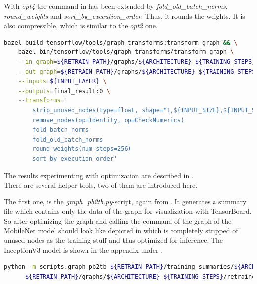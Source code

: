 With \textit{opt4} the command in  has been extended by \textit{fold_old_batch_norms}, \textit{round_weights} and \textit{sort_by_execution_order}. Thus, it rounds the weights. It is also compressible, which is similar to the \textit{opt2} one. \\

\begin{minipage}{\linewidth}
\begin{lstlisting}[caption=Build and call of \textit{transform_graph}, label=list:transform_graph_opt4, language=bash]
	bazel build tensorflow/tools/graph_transforms:transform_graph && \
	bazel-bin/tensorflow/tools/graph_transforms/transform_graph \
	--in_graph=${RETRAIN_PATH}/graphs/${ARCHITECTURE}_${TRAINING_STEPS}/retrained_dog_graph_${ARCHITECTURE}_${TRAINING_STEPS}_${LEARNING_RATE}.pb \
	--out_graph=${RETRAIN_PATH}/graphs/${ARCHITECTURE}_${TRAINING_STEPS}/opt4_retrained_dog_graph_${ARCHITECTURE}_${TRAINING_STEPS}_${LEARNING_RATE}.pb \
	--inputs=${INPUT_LAYER} \
	--outputs=final_result:0 \
	--transforms=' 
		strip_unused_nodes(type=float, shape="1,${INPUT_SIZE},${INPUT_SIZE},3")
		remove_nodes(op=Identity, op=CheckNumerics) 
		fold_batch_norms 
		fold_old_batch_norms 
		round_weights(num_steps=256)
		sort_by_execution_order'
\end{lstlisting}
\end{minipage}

The results experimenting with optimization are described in . \\

There are several helper tools, two of them are introduced here.

The first one, is the \textit{graph_pb2tb.py}-script, again from \citep{TensorflowDemo}. It generates a summary file which contains only the data of the graph for visualization with TensorBoard. So after optimizing the graph and calling the command of  the graph of the MobileNet model should look like depicted in  which is completely stripped of unused nodes as the training stuff and thus optimized for inference. The InceptionV3 model is shown in the appendix under . \\

\begin{minipage}{\linewidth}
\begin{lstlisting}[caption=Call of \textit{graph_pb2tb.py}, label=list:graph_pb2tb, language=bash]
	python -m scripts.graph_pb2tb ${RETRAIN_PATH}/training_summaries/${ARCHITECTURE}_${TRAINING_STEPS}/${ARCHITECTURE}_${TRAINING_STEPS}_${LEARNING_RATE}/retrained \
	  ${RETRAIN_PATH}/graphs/${ARCHITECTURE}_${TRAINING_STEPS}/retrained_dog_graph_${ARCHITECTURE}_${TRAINING_STEPS}_${LEARNING_RATE}.pb 
\end{lstlisting}
\end{minipage}

